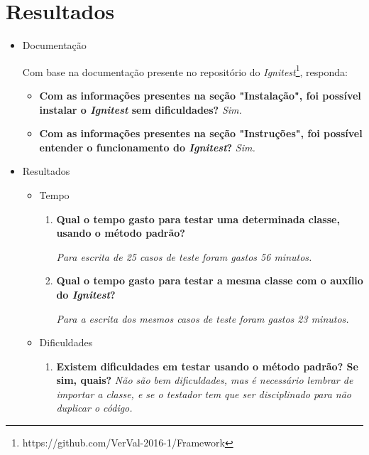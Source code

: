 \chapter{Resultados}
    
    \begin{itemize}
        \item Documentação
        
            Com base na documentação presente no repositório do \textit{Ignitest}\footnote{https://github.com/VerVal-2016-1/Framework}, responda:
            \begin{itemize}
                \item \textbf{Com as informações presentes na seção "Instalação", foi possível instalar o \textit{Ignitest} sem dificuldades?}
                    \subitem \textit{Sim.}

                \item \textbf{Com as informações presentes na seção "Instruções", foi possível entender o funcionamento do \textit{Ignitest}?}
                    \subitem \textit{Sim.}
            \end{itemize}

        \item Resultados
            \begin{itemize}
                \item Tempo
                    \begin{enumerate}
                        \item \textbf{Qual o tempo gasto para testar uma determinada classe, usando o método padrão?}

                            \subitem \textit{Para escrita de 25 casos de teste foram gastos 56 minutos.}              
              
                        \item \textbf{Qual o tempo gasto para testar a mesma classe com o auxílio do \textit{Ignitest}?}
              
                            \subitem \textit{Para a escrita dos mesmos casos de teste foram gastos 23 minutos.}
                        
                    \end{enumerate}
                \item Dificuldades
                    \begin{enumerate}
                        \item \textbf{Existem dificuldades em testar usando o método padrão? Se sim, quais?}
                            \subitem \textit{Não são bem dificuldades, mas é necessário lembrar de importar a classe, e se o testador tem que ser disciplinado para não duplicar o código.}


\end{enumerate}
\end{itemize}
\end{itemize}
